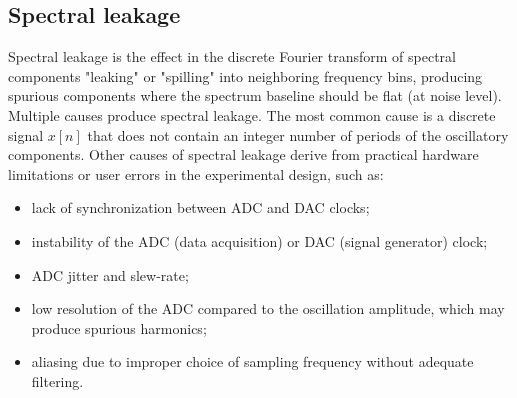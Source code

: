 



\subsection{Spectral leakage}

Spectral leakage is the effect in the discrete Fourier transform of spectral components "leaking" or "spilling" into neighboring frequency bins, producing spurious components where the spectrum baseline should be flat (at noise level).
Multiple causes produce spectral leakage.
The most common cause is a discrete signal $x[n]$ that does not contain an integer number of periods of the oscillatory components.
Other causes of spectral leakage derive from practical hardware limitations or user errors in the experimental design, such as:
\begin{itemize}
    \item lack of synchronization between ADC and DAC clocks;
    \item instability of the ADC (data acquisition) or DAC (signal generator) clock;
    \item ADC jitter and slew-rate;
    \item low resolution of the ADC compared to the oscillation amplitude, which may produce spurious harmonics;
    \item aliasing due to improper choice of sampling frequency without adequate filtering.
\end{itemize}

